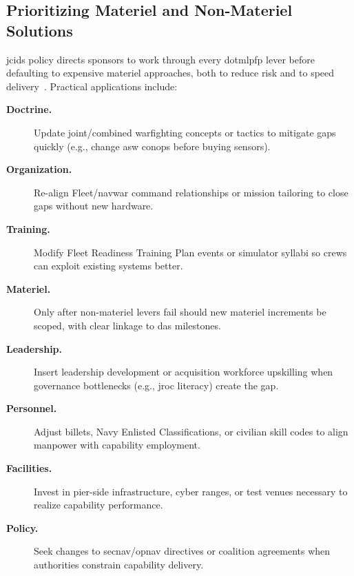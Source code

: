 \documentclass[../main.tex]{subfiles}
\begin{document}
\subsection{Prioritizing Materiel and Non-Materiel Solutions}
\Ac{jcids} policy directs sponsors to work through every \ac{dotmlpfp} lever before defaulting to expensive materiel approaches, both to reduce risk and to speed delivery~\autocite{jcids-manual-2021}. Practical applications include:
\begin{description}
  \item[\textbf{Doctrine.}] Update joint/combined warfighting concepts or tactics to mitigate gaps quickly (e.g., change \ac{asw} \ac{conops} before buying sensors).
  \item[\textbf{Organization.}] Re-align Fleet/\ac{navwar} command relationships or mission tailoring to close gaps without new hardware.
  \item[\textbf{Training.}] Modify Fleet Readiness Training Plan events or simulator syllabi so crews can exploit existing systems better.
  \item[\textbf{Materiel.}] Only after non-materiel levers fail should new materiel increments be scoped, with clear linkage to \ac{das} milestones.
  \item[\textbf{Leadership.}] Insert leadership development or acquisition workforce upskilling when governance bottlenecks (e.g., \ac{jroc} literacy) create the gap.
  \item[\textbf{Personnel.}] Adjust billets, Navy Enlisted Classifications, or civilian skill codes to align manpower with capability employment.
  \item[\textbf{Facilities.}] Invest in pier-side infrastructure, cyber ranges, or test venues necessary to realize capability performance.
  \item[\textbf{Policy.}] Seek changes to \ac{secnav}/\ac{opnav} directives or coalition agreements when authorities constrain capability delivery.
\end{description}
\end{document}
